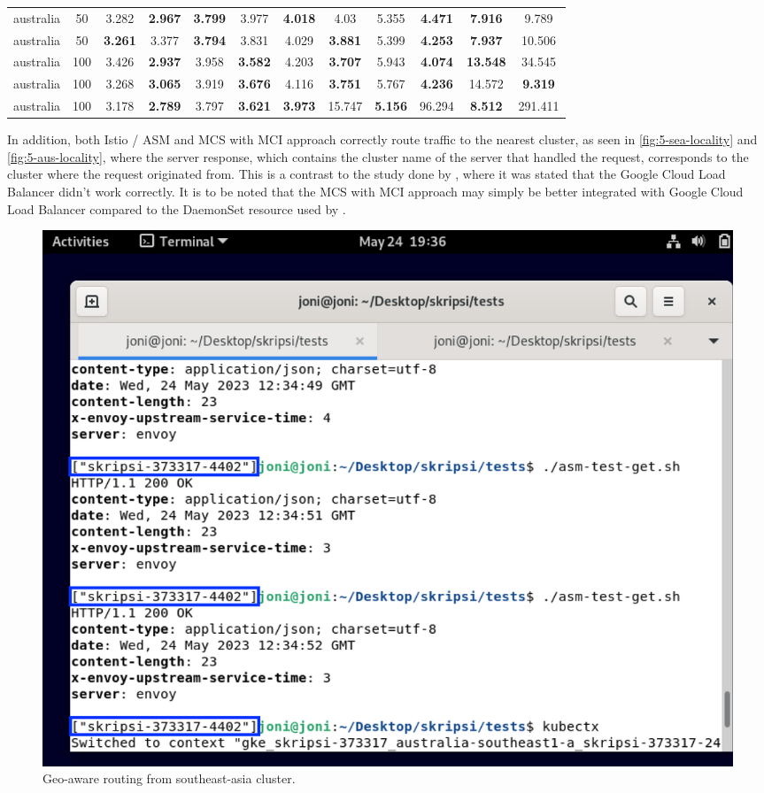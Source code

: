 \begin{table}[h]
\begin{adjustwidth}{-2cm}{-2cm}
\begin{tabular}{|c|c|c|c|c|c|c|c|c|c|c|c|}
australia & 50 & 3.282 & \textbf{2.967} & \textbf{3.799} & 3.977 & \textbf{4.018} & 4.03 & 5.355 & \textbf{4.471} & \textbf{7.916} & 9.789 \\ \cline{3-12}
australia & 50 & \textbf{3.261} & 3.377 & \textbf{3.794} & 3.831 & 4.029 & \textbf{3.881} & 5.399 & \textbf{4.253} & \textbf{7.937} & 10.506 \\ \cline{3-12}
australia & 100 & 3.426 & \textbf{2.937} & 3.958 & \textbf{3.582} & 4.203 & \textbf{3.707} & 5.943 & \textbf{4.074} & \textbf{13.548} & 34.545 \\ \cline{3-12}
australia & 100 & 3.268 & \textbf{3.065} & 3.919 & \textbf{3.676} & 4.116 & \textbf{3.751} & 5.767 & \textbf{4.236} & 14.572 & \textbf{9.319} \\ \cline{3-12}
australia & 100 & 3.178 & \textbf{2.789} & 3.797 & \textbf{3.621} & \textbf{3.973} & 15.747 & \textbf{5.156} & 96.294 & \textbf{8.512} & 291.411 \\ \hline

\end{tabular}
\label{tab:multi-cluster-performance-results}
\end{adjustwidth}
\end{table}

In addition, both Istio / ASM and MCS with MCI approach correctly route traffic to the nearest cluster, as seen in \autoref{fig:5-sea-locality} and \autoref{fig:5-aus-locality}, where the server response, which contains the cluster name of the server that handled the request, corresponds to the cluster where the request originated from. This is a contrast to the study done by \citet{andrew-2023}, where it was stated that the Google Cloud Load Balancer didn't work correctly. It is to be noted that the MCS with MCI approach may simply be better integrated with Google Cloud Load Balancer compared to the DaemonSet resource used by \cite{andrew-2023}.

\begin{figure}
	\centering
	\includegraphics[width=1\textwidth]{assets/pics/5-sea-locality.png}
	\caption{Geo-aware routing from southeast-asia cluster.}
	\label{fig:5-sea-locality}
\end{figure}

